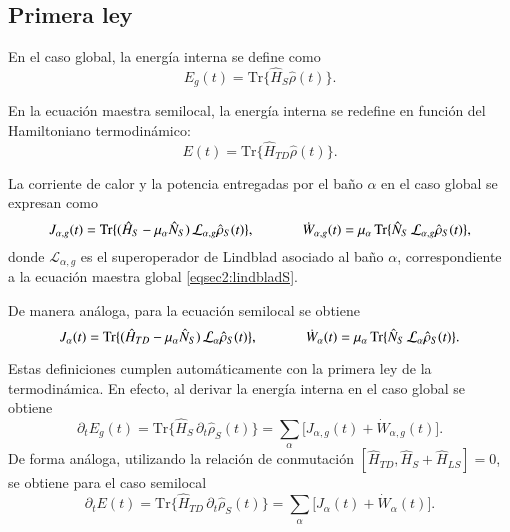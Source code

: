 \subsection*{Primera ley}

En el caso global, la energía interna se define como
\begin{equation*}
    E_{g}(t) = \text{Tr}\{\hat{H}_{S}\hat{\rho}(t)\}.
\end{equation*}

En la ecuación maestra semilocal, la energía interna se redefine en función del Hamiltoniano termodinámico:
\begin{equation}
    E(t) = \text{Tr}\{\hat{H}_{TD}\hat{\rho}(t)\}.
    \label{sec2:energyeq}
\end{equation}

La corriente de calor y la potencia entregadas por el baño $\alpha$ en el caso global se expresan como
\begin{equation*}
    J_{\alpha,g}(t) = \text{Tr}\{(\hat{H}_{S} - \mu_{\alpha}\hat{N}_S)\,\mathcal{L}_{\alpha,g}\hat{\rho}_{S}(t)\}, 
    \hspace{12mm} 
    \dot{W}_{\alpha,g}(t) = \mu_{\alpha}\,\text{Tr}\{\hat{N}_{S}\,\mathcal{L}_{\alpha,g}\hat{\rho}_{S}(t)\},
\end{equation*}
donde $\mathcal{L}_{\alpha,g}$ es el superoperador de Lindblad asociado al baño $\alpha$, correspondiente a la ecuación maestra global \eqref{eqsec2:lindbladS}.

De manera análoga, para la ecuación semilocal se obtiene
\begin{equation}
    J_{\alpha}(t) = \text{Tr}\{(\hat{H}_{TD} - \mu_{\alpha}\hat{N}_S)\,\mathcal{L}_{\alpha}\hat{\rho}_{S}(t)\}, 
    \hspace{12mm} 
    \dot{W}_{\alpha}(t) = \mu_{\alpha}\,\text{Tr}\{\hat{N}_{S}\,\mathcal{L}_{\alpha}\hat{\rho}_{S}(t)\}.
    \label{sec2:heatworkeq}
\end{equation}

Estas definiciones cumplen automáticamente con la primera ley de la termodinámica. 
En efecto, al derivar la energía interna en el caso global se obtiene
\begin{equation*}
    \partial_{t}E_{g}(t) = \text{Tr}\{\hat{H}_{S}\,\partial_{t}\hat{\rho}_{S}(t)\} 
    = \sum_{\alpha}\big[J_{\alpha,g}(t) + \dot{W}_{\alpha,g}(t)\big].
\end{equation*}
De forma análoga, utilizando la relación de conmutación $[\hat{H}_{TD},\hat{H}_{S}+\hat{H}_{LS}] = 0$, 
se obtiene para el caso semilocal
\begin{equation*}
    \partial_{t}E(t) = \text{Tr}\{\hat{H}_{TD}\,\partial_{t}\hat{\rho}_{S}(t)\} 
    = \sum_{\alpha}\big[J_{\alpha}(t) + \dot{W}_{\alpha}(t)\big].
\end{equation*}


